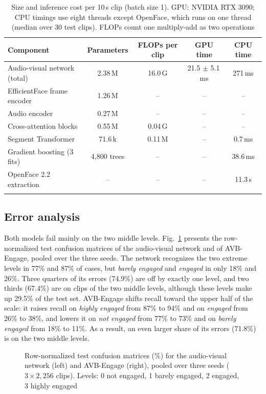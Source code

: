 \documentclass[pdflatex,iicol,sn-basic]{sn-jnl}
\newcommand{\ournet}{AVB-Engage}
\begin{document}
\begin{table}[t]
\caption{Size and inference cost per 10\,s clip (batch size 1). GPU: NVIDIA RTX 3090; CPU timings use eight threads except OpenFace, which runs on one thread (median over 30 test clips). FLOPs count one multiply-add as two operations}\label{tab:cost}
\begin{tabular*}{\textwidth}{@{\extracolsep\fill}lcccc}
\toprule
Component & Parameters & FLOPs per clip & GPU time & CPU time\\
\midrule
Audio-visual network (total) & 2.38\,M & 16.0\,G & 21.5 $\pm$ 5.1\,ms & 271\,ms\\
\quad EfficientFace frame encoder & 1.26\,M & -- & -- & --\\
\quad Audio encoder & 0.27\,M & -- & -- & --\\
\quad Cross-attention blocks & 0.55\,M & 0.04\,G & -- & --\\
Segment Transformer & 71.6\,k & 0.11\,M & -- & 0.7\,ms\\
Gradient boosting (3 fits) & 4,800 trees & -- & -- & 38.6\,ms\\
OpenFace 2.2 extraction & -- & -- & -- & 11.3\,s\\
\botrule
\end{tabular*}
\end{table}

\subsection{Error analysis}\label{sec:res_errors}

Both models fail mainly on the two middle levels. Fig.~\ref{fig:confusion} presents the row-normalized test confusion matrices of the audio-visual network and of \ournet, pooled over the three seeds. The network recognizes the two extreme levels in 77\% and 87\% of cases, but \emph{barely engaged} and \emph{engaged} in only 18\% and 26\%. Three quarters of its errors (74.9\%) are off by exactly one level, and two thirds (67.4\%) are on clips of the two middle levels, although these levels make up 29.5\% of the test set. \ournet{} shifts recall toward the upper half of the scale: it raises recall on \emph{highly engaged} from 87\% to 94\% and on \emph{engaged} from 26\% to 38\%, and lowers it on \emph{not engaged} from 77\% to 73\% and on \emph{barely engaged} from 18\% to 11\%. As a result, an even larger share of its errors (71.8\%) is on the two middle levels.

\begin{figure}[t]
\centering

\caption{Row-normalized test confusion matrices (\%) for the audio-visual network (left) and \ournet{} (right), pooled over three seeds ($3 \times 2{,}256$ clips). Levels: 0 not engaged, 1 barely engaged, 2 engaged, 3 highly engaged}
\label{fig:confusion}
\end{figure}
\end{document}
